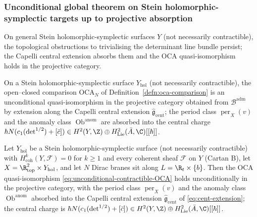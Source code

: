 \subsubsection{Unconditional global theorem on Stein
holomorphic-symplectic targets up to projective absorption}
\label{sssec:unconditional-global-stein-projective}

On general Stein holomorphic-symplectic surfaces \(Y\) (not
necessarily contractible), the topological obstructions to
trivialising the determinant line bundle persist; the Capelli central
extension absorbs them and the OCA quasi-isomorphism holds in the
projective category.

\begin{thm}
\label{thm:unconditional-global-stein-HS-projective}
On a Stein holomorphic-symplectic surface $Y_{\mathrm{hol}}$
(not necessarily contractible), the open--closed comparison
$\mathrm{OCA}_N$ of Definition~\ref{defn:oca-comparison} is an
unconditional quasi-isomorphism in the projective category obtained
from $\mathcal B^{\mathrm{adm}}$ by extension along the Capelli
central extension $\widehat{\mathfrak g}_{\mathrm{cent}}$; the period
class $\operatorname{per}_X(v)$ and the anomaly class
$\operatorname{Ob}^{\mathrm{anom}}$ are absorbed into the central
charge $\hbar N(c_1(\det^{1/2})+[\bar c])\in
H^2(Y,\Z)\oplus H^2_{\mathrm{Lie}}(\bar A,\C)[[\hbar]]$.

Let \(Y_{\mathrm{hol}}\) be a Stein holomorphic-symplectic surface
(not necessarily contractible) with
\(H^k_{\mathrm{coh}}(Y,\mathcal F)=0\) for \(k\geq 1\) and every
coherent sheaf \(\mathcal F\) on \(Y\) (Cartan B), let
\(X=\R^2_{\mathrm{top}}\times Y_{\mathrm{hol}}\), and let \(N\) Dirac
branes sit along \(L=\R_t\times\{b\}\).  Then the OCA
quasi-isomorphism \eqref{eq:unconditional-contractible-OCA} holds
unconditionally in the projective category, with the period class
\(\operatorname{per}_X(v)\) and the anomaly class
\(\operatorname{Ob}^{\mathrm{anom}}\) absorbed into the Capelli
central extension \(\widehat{\mathfrak g}_{\mathrm{cent}}\) of
\eqref{eq:cent-extension}; the central charge is
\(\hbar N(c_1(\det^{1/2})+[\bar c])\in
H^2(Y,\Z)\oplus H^2_{\mathrm{Lie}}(\bar A,\C)[[\hbar]]\).
\end{thm}

